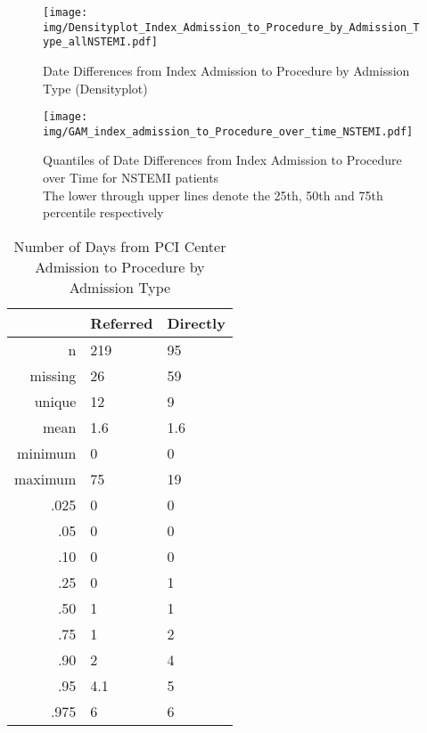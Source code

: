 \documentclass[presentation,xcolor=pdftex,dvipsnames,table,11pt]{beamer}
\begin{document}
\begin{tiny}
\begin{frame}
\begin{figure}
  \centering
  \caption{Date Differences from Index Admission to Procedure by Admission Type (Densityplot)}
  \label{Density: Date Differences from Index Admission to Procedure by Admission Type}
\texttt{[image: img/Densityplot\_Index\_Admission\_to\_Procedure\_by\_Admission\_Type\_allNSTEMI.pdf]}\end{figure}
\end{frame}

\begin{frame}
\begin{figure}
  \centering
  \caption{Quantiles of Date Differences from Index Admission to Procedure over Time for NSTEMI patients\\
  The lower through upper lines denote the 25th, 50th and 75th percentile respectively}
  \label{GAM: Date Differences from Index Admission to Procedure over Month of 2013 in NSTEMI patients}
\texttt{[image: img/GAM\_index\_admission\_to\_Procedure\_over\_time\_NSTEMI.pdf]}\end{figure}
\end{frame}




\begin{frame}
\begin{table}[ht]
\centering
\begin{tabular}{rll}
  \toprule
 & Referred & Directly \\ 
  \midrule
n & 219 & 95 \\ 
  missing & 26 & 59 \\ 
  unique & 12 & 9 \\ 
  mean & 1.6 & 1.6 \\ 
  minimum & 0 & 0 \\ 
  maximum & 75 & 19 \\ 
  .025 & 0 & 0 \\ 
  .05 & 0 & 0 \\ 
  .10 & 0 & 0 \\ 
  .25 & 0 & 1 \\ 
  .50 & 1 & 1 \\ 
  .75 & 1 & 2 \\ 
  .90 & 2 & 4 \\ 
  .95 & 4.1 & 5 \\ 
  .975 & 6 & 6 \\ 
   \bottomrule
\end{tabular}
\caption{Number of Days from PCI Center Admission to Procedure by Admission Type} 
\end{table}\end{frame}



\end{tiny}
\end{document}

